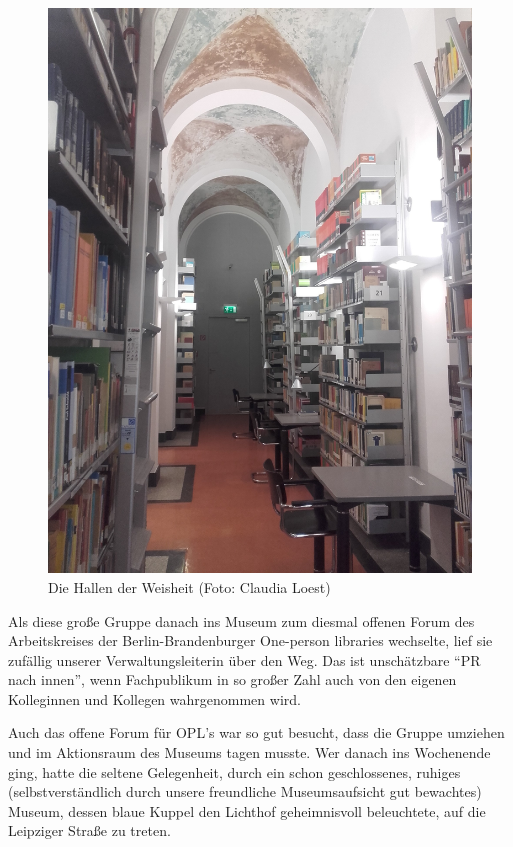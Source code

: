 \documentclass[a4paper,
fontsize=11pt,
oneside,
numbers=noperiodatend,
parskip=half-,
bibliography=totoc,
final
]{scrartcl}
\begin{document}
\begin{figure}
\centering
\includegraphics{img/Loest_2.jpg}
\caption{Die Hallen der Weisheit (Foto: Claudia Loest)}
\end{figure}

Als diese große Gruppe danach ins Museum zum diesmal offenen Forum des
Arbeitskreises der Berlin-Brandenburger One-person libraries wechselte,
lief sie zufällig unserer Verwaltungsleiterin über den Weg. Das ist
unschätzbare \enquote{PR nach innen}, wenn Fachpublikum in so großer
Zahl auch von den eigenen Kolleginnen und Kollegen wahrgenommen wird.

Auch das offene Forum für OPL's war so gut besucht, dass die Gruppe
umziehen und im Aktionsraum des Museums tagen musste. Wer danach ins
Wochenende ging, hatte die seltene Gelegenheit, durch ein schon
geschlossenes, ruhiges (selbstverständlich durch unsere freundliche
Museumsaufsicht gut bewachtes) Museum, dessen blaue Kuppel den Lichthof
geheimnisvoll beleuchtete, auf die Leipziger Straße zu treten.
\end{document}
